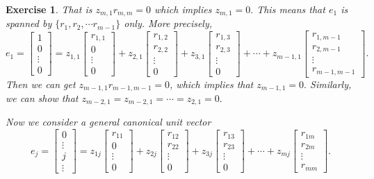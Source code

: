\documentclass[paper=a4, fontsize=11pt]{scrartcl} %
\numberwithin{equation}{section} %
\numberwithin{figure}{section} %
\numberwithin{table}{section} %
\newtheorem{exercise}{Exercise}
\numberwithin{exercise}{section}
\begin{document}
\begin{exercise}
That is $z_{m,1} r_{m,m}=0$ which implies $z_{m,1}=0.$  This means that $e_1$ is spanned by $\{ r_1, r_2,\cdots r_{m-1}\}$ only. More precisely,
$$e_1=\begin{bmatrix}
1\\
0\\
\vdots \\
0\end{bmatrix}=z_{1,1}\begin{bmatrix}
r_{1,1}\\
0\\
\vdots \\
0\end{bmatrix}+z_{2,1}\begin{bmatrix}
r_{1,2}\\
r_{2,2}\\
\vdots \\
0\end{bmatrix}+z_{3,1}\begin{bmatrix}
r_{1,3}\\
r_{2,3}\\
\vdots \\
0\end{bmatrix} +\cdots+z_{m-1,1}\begin{bmatrix}
r_{1,m-1}\\
r_{2,m-1}\\
\vdots \\
r_{m-1,m-1}\end{bmatrix}.
$$
Then we can get $z_{m-1,1}r_{m-1,m-1}=0$, which implies that $z_{m-1,1}=0.$
Similarly, we can show that $z_{m-2, 1}=z_{m-2,1}=\cdots=z_{2,1}=0.$

Now we consider a general canonical unit vector 
$$e_j=\begin{bmatrix}
0\\
\vdots \\
j\\
\vdots\end{bmatrix}=z_{1j}\begin{bmatrix}
r_11\\
0\\
\vdots \\
0\end{bmatrix}+z_{2j}\begin{bmatrix}
r_{12}\\
r_{22}\\
\vdots \\
0\end{bmatrix}+z_{3j}\begin{bmatrix}
r_{13}\\
r_{23}\\
\vdots \\
0\end{bmatrix} +\cdots+z_{mj}\begin{bmatrix}
r_{1m}\\
r_{2m}\\
\vdots \\
r_{mm}\end{bmatrix}.$$


\end{exercise}
\end{document}
